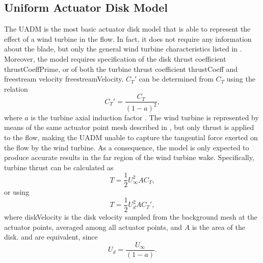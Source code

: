 \subsection{Uniform Actuator Disk Model}
\label{subsec:uniformActuatorDiskModel}
The UADM is the most basic actuator disk model that is able to represent the effect of a wind turbine in the flow. In fact, it does not require any information about the blade, but only the general wind turbine characteristics listed in . Moreover, the model requires specification of the disk thrust coefficient \gls{thrustCoeffPrime}, or of both the turbine thrust coefficient \gls{thrustCoeff} and freestream velocity \gls{freestreamVelocity}. $C_T'$ can be determined from $C_T$ using the relation
\begin{equation}
	C_T' = \frac{C_T}{(1-a)^2}, \label{eq:diskThrustCoeff}
\end{equation}
where $a$ is the turbine axial induction factor \citep{CalafEtAl2010}. The wind turbine is represented by means of the same actuator point mesh described in , but only thrust is applied to the flow, making the UADM unable to capture the tangential force exerted on the flow by the wind turbine. As a consequence, the model is only expected to produce accurate results in the far region of the wind turbine wake. Specifically, turbine thrust can be calculated as 
\begin{equation}
	T = \frac{1}{2}U_\infty^2AC_T, \label{eq:thrustCT}
\end{equation}
or using 
\begin{equation}
	T = \frac{1}{2}U_d^2AC_T', \label{eq:thrustCTPrime}
\end{equation}
where \gls{diskVelocity} is the disk velocity sampled from the background mesh at the actuator points, averaged among all actuator points, and $A$ is the area of the disk.  and  are equivalent, since 
\begin{equation}
	U_d = \frac{U_\infty}{(1-a)}. \label{eq:diskVelocity}
\end{equation}
